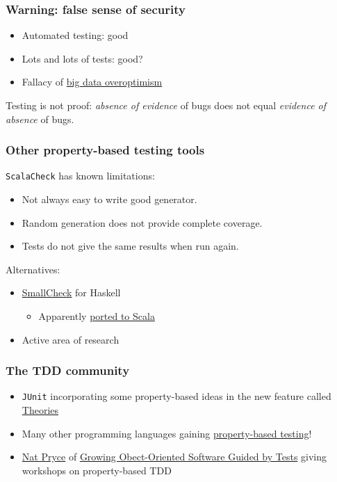 \begin{frame}
  \frametitle{Warning: false sense of security}

  \begin{itemize}
    \item Automated testing: good
    \item Lots and lots of tests: good?
    \item Fallacy of \href{http://radar.oreilly.com/2013/04/data-skepticism.html}{big data overoptimism}
  \end{itemize}

  Testing is not proof: \emph{absence of evidence} of bugs does not equal \emph{evidence of absence} of bugs.
\end{frame}

\begin{frame}
  \frametitle{Other property-based testing tools}

  \texttt{ScalaCheck} has known limitations:
  \begin{itemize}
    \item Not always easy to write good generator.
    \item Random generation does not provide complete coverage.
    \item Tests do not give the same results when run again.
  \end{itemize}

  Alternatives:
  \begin{itemize}
    \item \href{http://www.cs.york.ac.uk/fp/smallcheck/}{SmallCheck} for Haskell
      \begin{itemize}
        \item Apparently \href{https://github.com/dwhjames/smallcheck4scala}{ported to Scala}
      \end{itemize}
    \item Active area of research
  \end{itemize}
\end{frame}

\begin{frame}
  \frametitle{The TDD community}

  \begin{itemize}
    \item \texttt{JUnit} incorporating some property-based ideas in the new feature called \href{https://github.com/junit-team/junit/wiki/Theories}{Theories}
    \item Many other programming languages gaining \href{http://en.wikipedia.org/wiki/QuickCheck}{property-based testing}!
    \item \href{http://www.natpryce.com/}{Nat Pryce} of \href{http://www.growing-object-oriented-software.com/}{Growing Obect-Oriented Software Guided by Tests} giving workshops on property-based TDD
  \end{itemize}
\end{frame}

